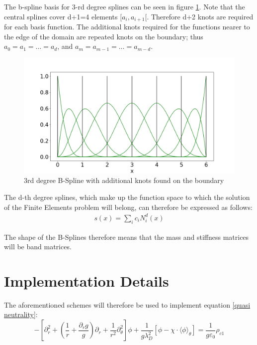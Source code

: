 The b-spline basis for 3-rd degree splines can be seen in figure \ref{3rd degree BSplines}. Note that the central splines cover d+1=4 elements $[a_i,a_{i+1}[$. Therefore d+2 knots are required for each basis function. The additional knots required for the functions nearer to the edge of the domain are repeated knots on the boundary; thus $a_0=a_1=\dots=a_d$, and $a_m=a_{m-1}=\dots=a_{m-d}$.

\begin{figure}[ht]
 \centering
 \includegraphics[width=\textwidth]{Figs/bSplines.png}
 \caption{\label{3rd degree BSplines}3rd degree B-Spline with additional knots found on the boundary}
\end{figure}

The d-th degree splines, which make up the function space to which the solution of the Finite Elements problem will belong, can therefore be expressed as follows:
\begin{align}
s(x)=\underset{i}{\sum}c_iN_i^d(x)
\end{align}

The shape of the B-Splines therefore means that the mass and stiffness matrices will be band matrices.

\section{Implementation Details}

The aforementioned schemes will therefore be used to implement equation \ref{quasi neutrality}:
\begin{equation}
 -\left[\partial_r^2+\left(\frac{1}{r}+\frac{\partial_rg}{g}\right)\partial_r+\frac{1}{r^2}\partial_\theta^2\right]\phi+\frac{1}{g\lambda_D^2}\left[\phi-\chi\cdot\langle\phi\rangle_\theta\right]=\frac{1}{g\varepsilon_0}\rho_{c1}
\end{equation}

